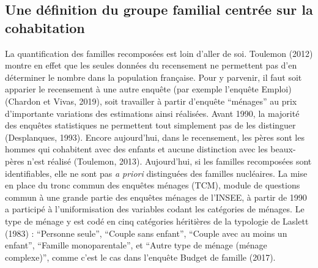 \documentclass[
  12pt,
]{book}
\begin{document}
\subsection{Une définition du groupe familial centrée sur la
cohabitation}\label{une-duxe9finition-du-groupe-familial-centruxe9e-sur-la-cohabitation}

La quantification des familles recomposées est loin d'aller de soi.
Toulemon (2012) montre en effet que les seules données du recensement ne
permettent pas d'en déterminer le nombre dans la population française.
Pour y parvenir, il faut soit apparier le recensement à une autre
enquête (par exemple l'enquête Emploi) (Chardon et Vivas, 2019), soit
travailler à partir d'enquête ``ménages'' au prix d'importante
variations des estimations ainsi réalisées. Avant 1990, la majorité des
enquêtes statistiques ne permettent tout simplement pas de les
distinguer (Desplanques, 1993). Encore aujourd'hui, dans le recensement,
les pères sont les hommes qui cohabitent avec des enfants et aucune
distinction avec les beaux-pères n'est réalisé (Toulemon, 2013).
Aujourd'hui, si les familles recomposées sont identifiables, elle ne
sont pas \emph{a priori} distinguées des familles nucléaires. La mise en
place du tronc commun des enquêtes ménages (TCM), module de questions
commun à une grande partie des enquêtes ménages de l'INSEE, à partir de
1990 a participé à l'uniformisation des variables codant les catégories
de ménages. Le type de ménage y est codé en cinq catégories héritières
de la typologie de Laslett (1983) : ``Personne seule'', ``Couple sans
enfant'', ``Couple avec au moins un enfant'', ``Famille monoparentale'',
et ``Autre type de ménage (ménage complexe)'', comme c'est le cas dans
l'enquête Budget de famille (2017).
\end{document}
